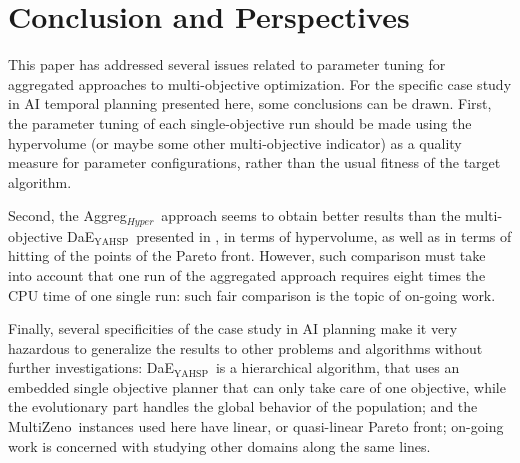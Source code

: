 \documentclass{llncs}
\newcommand{\DAEYAHSP}{{\sc DaE$_{\text{YAHSP}}$}}
\def\MULTIZENO{{\sc MultiZeno}}
\def\AGGREGHYPER{{Aggreg$_{Hyper}$}}
\begin{document}

 
\section{Conclusion and Perspectives}
\label{sec:conclusion}
This paper has addressed several issues related to parameter tuning for aggregated approaches to multi-objective optimization. For the specific case study in AI temporal planning presented here, some conclusions can be drawn.
First, the parameter tuning of each single-objective run should be made using the hypervolume (or maybe some other multi-objective indicator) as a quality measure for parameter configurations, rather than the usual fitness of the target algorithm. 

Second, the \AGGREGHYPER\ approach seems to obtain better results than the multi-objective \DAEYAHSP\ presented in \cite{emo2013}, in terms of hypervolume, as well as in terms of hitting of the points of the Pareto front. However, such comparison must take into account that one run of the aggregated approach requires eight times the CPU time of one single run: such fair comparison is the topic of on-going work.

Finally, several specificities of the case study in AI planning make it very hazardous to generalize the results to other problems and algorithms without further investigations: \DAEYAHSP\ is a hierarchical algorithm, that uses an embedded single objective planner that can only take care of one objective, while the evolutionary part handles the global behavior of the population; and the \MULTIZENO\ instances used here have linear, or quasi-linear Pareto front; on-going work is concerned with studying other domains along the same lines.
\end{document}

